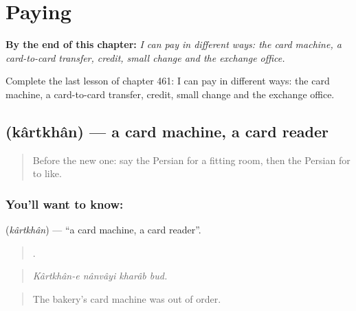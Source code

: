 
\chapter{Paying}
\label{ch:fa-paying}

\begin{chapteropening}
\textbf{By the end of this chapter:} \emph{I can pay in different ways: the card machine, a card-to-card transfer, credit, small change and the exchange office.}

Complete the last lesson of chapter 461: I can pay in different ways: the card machine, a card-to-card transfer, credit, small change and the exchange office.
\end{chapteropening}

\section[\texorpdfstring{\fa{کارتخوان} (kârtkhân)}{کارتخوان (kârtkhân)}]{ (kârtkhân) — a card machine, a card reader}

\label{lesson:FA-C461-kartkhan}



\begin{quote}
Before the new one: say the Persian for a fitting room, then the Persian for to like.
\end{quote}

\subsection*{You'll want to know: }
\textbf{} (\emph{kârtkhân}) — \textquotedblleft{}a card machine, a card reader\textquotedblright{}.

\begin{quote}
   .
\end{quote}

\begin{quote}
\emph{Kârtkhân-e nânvâyi kharâb bud.}
\end{quote}

\begin{quote}
The bakery's card machine was out of order.
\end{quote}

